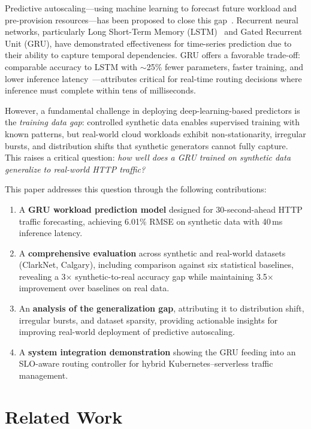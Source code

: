 \documentclass[conference,letterpaper]{IEEEtran}
\begin{document}
Predictive autoscaling---using machine learning to forecast future workload and pre-provision resources---has been proposed to close this gap~\cite{he2020scaling,mondal2023kubernetes}. Recurrent neural networks, particularly Long Short-Term Memory (LSTM)~\cite{hochreiter1997long} and Gated Recurrent Unit (GRU), have demonstrated effectiveness for time-series prediction due to their ability to capture temporal dependencies. GRU offers a favorable trade-off: comparable accuracy to LSTM with $\sim$25\% fewer parameters, faster training, and lower inference latency~\cite{chung2014empirical}---attributes critical for real-time routing decisions where inference must complete within tens of milliseconds.

However, a fundamental challenge in deploying deep-learning-based predictors is the \textit{training data gap}: controlled synthetic data enables supervised training with known patterns, but real-world cloud workloads exhibit non-stationarity, irregular bursts, and distribution shifts that synthetic generators cannot fully capture. This raises a critical question: \textit{how well does a GRU trained on synthetic data generalize to real-world HTTP traffic?}

This paper addresses this question through the following contributions:

\begin{enumerate}
    \item A \textbf{GRU workload prediction model} designed for 30-second-ahead HTTP traffic forecasting, achieving 6.01\% RMSE on synthetic data with 40\,ms inference latency.
    \item A \textbf{comprehensive evaluation} across synthetic and real-world datasets (ClarkNet, Calgary), including comparison against six statistical baselines, revealing a 3$\times$ synthetic-to-real accuracy gap while maintaining 3.5$\times$ improvement over baselines on real data.
    \item An \textbf{analysis of the generalization gap}, attributing it to distribution shift, irregular bursts, and dataset sparsity, providing actionable insights for improving real-world deployment of predictive autoscaling.
    \item A \textbf{system integration demonstration} showing the GRU feeding into an SLO-aware routing controller for hybrid Kubernetes--serverless traffic management.
\end{enumerate}

\section{Related Work}
\end{document}
